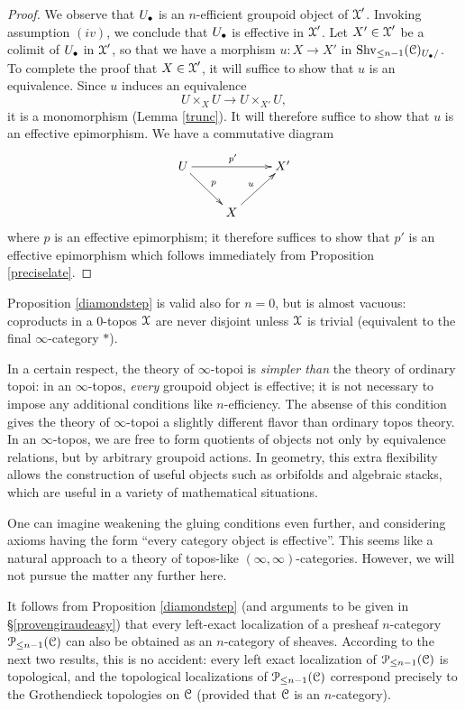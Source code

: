 \begin{proof}
We observe that $U_{\bullet}$ is an $n$-efficient groupoid object of $\operatorname{\mathcal{X}}'$. Invoking assumption $(iv)$, we conclude that $U_{\bullet}$ is effective in $\operatorname{\mathcal{X}}'$. Let $X' \in \operatorname{\mathcal{X}}'$ be a colimit of $U_{\bullet}$ in $\operatorname{\mathcal{X}}'$, so that we have a morphism $u: X \rightarrow X'$ in $\operatorname{Shv}_{\leq n-1}(\operatorname{\mathcal{C}})_{U_{\bullet}/}$. To complete the proof that $X \in \operatorname{\mathcal{X}}'$, it will suffice to show that $u$ is an equivalence. Since $u$ induces an equivalence
$$ U \times_{X} U \rightarrow U \times_{X'} U,$$
it is a monomorphism (Lemma \ref{trunc}). It will therefore suffice to show that $u$ is an effective epimorphism. We have a commutative diagram
$$ \xymatrix{ U \ar[dr]^{p} \ar[rr]^{p'} & & X' \\
& X \ar[ur]^{u} & }$$
where $p$ is an effective epimorphism; it therefore suffices to show that $p'$ is an effective epimorphism which follows immediately from Proposition \ref{preciselate}.
\end{proof}

\begin{remark}
Proposition \ref{diamondstep} is valid also for $n=0$, but is almost vacuous: coproducts
in a $0$-topos $\operatorname{\mathcal{X}}$ are never disjoint unless $\operatorname{\mathcal{X}}$ is trivial (equivalent to the final $\infty$-category $\ast$).
\end{remark}

\begin{remark}
In a certain respect, the theory of $\infty$-topoi is {\em simpler than} the theory of ordinary topoi: in an $\infty$-topos, {\em every} groupoid object is effective; it is not necessary to impose any additional conditions like $n$-efficiency. The absense of this condition gives the theory
of $\infty$-topoi a slightly different flavor than ordinary topos theory. In an $\infty$-topos, we are free
to form quotients of objects not only by equivalence relations, but by arbitrary groupoid actions.
In geometry, this extra flexibility allows the construction of useful objects such as orbifolds and algebraic stacks, which are useful in a variety of mathematical situations.

One can imagine weakening the gluing conditions even further, and
considering axioms having the form ``every category object is
effective''. This seems like a natural approach to a theory
of topos-like $(\infty,\infty)$-categories. However, we will not pursue the matter any further here.
\end{remark}

It follows from Proposition \ref{diamondstep} (and arguments to be given in \S \ref{provengiraudeasy}) that every left-exact localization of a presheaf $n$-category
$\operatorname{\mathcal{P}}_{\leq n-1}(\operatorname{\mathcal{C}})$ can also be obtained as an $n$-category of sheaves. According to the next two results, this is no accident: every left exact localization of $\operatorname{\mathcal{P}}_{\leq n-1}(\operatorname{\mathcal{C}})$ is topological, and the topological localizations of $\operatorname{\mathcal{P}}_{\leq n-1}(\operatorname{\mathcal{C}})$ correspond precisely to the Grothendieck topologies on $\operatorname{\mathcal{C}}$ (provided that $\operatorname{\mathcal{C}}$ is an $n$-category).


